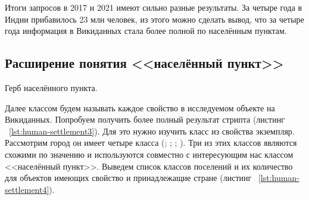 Итоги запросов в 2017 и 2021 имеют сильно разные результаты. За четыре года в Индии прибавилось 23 млн человек, из этого можно сделать вывод, что за четыре года информация в Викиданных стала более полной по населённым пунктам.


\subsection{Расширение понятия <<населённый пункт>>}

\begin{marginfigure}[0.0cm]
{
\setlength{\fboxsep}{0pt}%
\setlength{\fboxrule}{1pt}%
%
}
  \caption{Герб населённого пункта.}%
  \label{fig:flag_question_human_settlements2}%
\end{marginfigure}


Далее классом будем называть каждое свойство  в исследуемом объекте на Викиданных. Попробуем получить более полный результат стрипта (листинг ~\protect\ref{lst:human-settlement3}). Для это нужно изучить класс  из свойства экземпляр. Рассмотрим город  он имеет четыре класса (; ; ; ). Три из этих классов являются схожими по значению и используются совместно с интересующим нас классом <<населённый пункт>>. Выведем список классов поселений и их количество для объектов имеющих свойство  и принадлежащие стране  (листинг ~\protect\ref{lst:human-settlement4}). 

